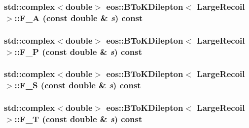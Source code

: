 \label{classeos_1_1BToKDilepton_3_01LargeRecoil_01_4_a486e55270938cb3588e20ae0225f769c}
\hypertarget{classeos_1_1BToKDilepton_3_01LargeRecoil_01_4_a72e5db40a97d248d57b1ff22ab0ce78d}{
\subsubsection[{F\_\-A}]{\setlength{\rightskip}{0pt plus 5cm}std::complex$<$double$>$ eos::BToKDilepton$<$ {\bf LargeRecoil} $>$::F\_\-A (const double \& {\em s}) const}}
\label{classeos_1_1BToKDilepton_3_01LargeRecoil_01_4_a72e5db40a97d248d57b1ff22ab0ce78d}
\hypertarget{classeos_1_1BToKDilepton_3_01LargeRecoil_01_4_a6bcc1cc0fa58626da2f94b3dc3bbc8c4}{
\subsubsection[{F\_\-P}]{\setlength{\rightskip}{0pt plus 5cm}std::complex$<$double$>$ eos::BToKDilepton$<$ {\bf LargeRecoil} $>$::F\_\-P (const double \& {\em s}) const}}
\label{classeos_1_1BToKDilepton_3_01LargeRecoil_01_4_a6bcc1cc0fa58626da2f94b3dc3bbc8c4}
\hypertarget{classeos_1_1BToKDilepton_3_01LargeRecoil_01_4_a0da80045cac14ed85dcb306fe76b75c4}{
\subsubsection[{F\_\-S}]{\setlength{\rightskip}{0pt plus 5cm}std::complex$<$double$>$ eos::BToKDilepton$<$ {\bf LargeRecoil} $>$::F\_\-S (const double \& {\em s}) const}}
\label{classeos_1_1BToKDilepton_3_01LargeRecoil_01_4_a0da80045cac14ed85dcb306fe76b75c4}
\hypertarget{classeos_1_1BToKDilepton_3_01LargeRecoil_01_4_a7b0d805213f319d4de219ba0333d25b6}{
\subsubsection[{F\_\-T}]{\setlength{\rightskip}{0pt plus 5cm}std::complex$<$double$>$ eos::BToKDilepton$<$ {\bf LargeRecoil} $>$::F\_\-T (const double \& {\em s}) const}}
